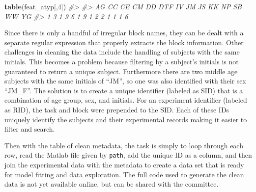 \documentclass[11pt, oneside, openany]{scrbook}
\newenvironment{Shaded}{\begin{snugshade}}{\end{snugshade}}
\newcommand{\CommentTok}[1]{\textcolor[rgb]{0.56,0.35,0.01}{\textit{#1}}}
\newcommand{\DecValTok}[1]{\textcolor[rgb]{0.00,0.00,0.81}{#1}}
\newcommand{\KeywordTok}[1]{\textcolor[rgb]{0.13,0.29,0.53}{\textbf{#1}}}
\newcommand{\NormalTok}[1]{#1}
\begin{document}
\begin{Shaded}
\begin{Highlighting}[]
\KeywordTok{table}\NormalTok{(feat_atyp[,}\DecValTok{4}\NormalTok{])}
\CommentTok{#> }
\CommentTok{#>  AG  CC  CE  CM  DD DTF  IV  JM  JS  KK  NP  SB  WW  YG }
\CommentTok{#>   1   3   1   9   6   1   9   1   2   2   1   1   1   6}
\end{Highlighting}
\end{Shaded}

Since there is only a handful of irregular block names, they can be dealt with a separate regular expression that properly extracts the block information. Other challenges in cleaning the data include the handling of subjects with the same initials. This becomes a problem because filtering by a subject's initials is not guaranteed to return a unique subject. Furthermore there are two middle age subjects with the same initials of ``JM'', so one was also identified with their sex ``JM\_F''. The solution is to create a unique identifier (labeled as SID) that is a combination of age group, sex, and initials. For an experiment identifier (labeled as RID), the task and block were prepended to the SID. Each of these IDs uniquely identify the subjects and their experimental records making it easier to filter and search.

\begin{Shaded}
\end{Shaded}

Then with the table of clean metadata, the task is simply to loop through each row, read the Matlab file given by \texttt{path}, add the unique ID as a column, and then join the experimental data with the metadata to create a data set that is ready for model fitting and data exploration. The full code used to generate the clean data is not yet available online, but can be shared with the committee.
\end{document}
